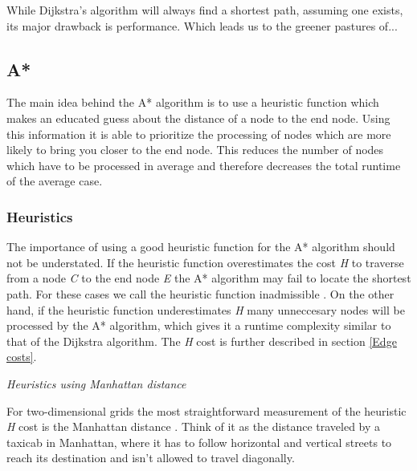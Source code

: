 \documentclass[12pt, a4paper]{article}
\begin{document}
While Dijkstra's algorithm will always find a shortest path, assuming one exists, its
major drawback is performance. Which leads us to the greener pastures of...



\subsection{A*}


The main idea behind the A* algorithm is to use a heuristic function which makes
an educated guess about the distance of a node to the end node. Using this
information it is able to prioritize the processing of nodes which are more
likely to bring you closer to the end node. This reduces the number of nodes
which have to be processed in average and therefore decreases the total runtime
of the average case.


\subsubsection{Heuristics}
\label{Heuristics}

The importance of using a good heuristic function for the A* algorithm should
not be understated. If the heuristic function overestimates the cost \textit{H}
to traverse from a node \textit{C} to the end node \textit{E} the A* algorithm
may fail to locate the shortest path. For these cases we call the heuristic
function inadmissible \cite{astar2}. On the other hand, if the heuristic
function underestimates \textit{H} many unneccesary nodes will be processed by
the A* algorithm, which gives it a runtime complexity similar to that of the
Dijkstra algorithm. The \textit{H} cost is further described in section
\ref{Edge costs}.

\textit{Heuristics using Manhattan distance}

For two-dimensional grids the most straightforward measurement of the heuristic
\textit{H} cost is the Manhattan distance \cite{manhattan}. Think of it as the
distance traveled by a taxicab in Manhattan, where it has to follow horizontal
and vertical streets to reach its destination and isn't allowed to travel
diagonally.
\end{document}
